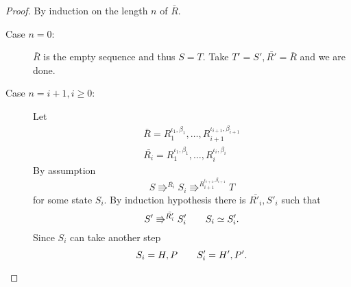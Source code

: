 \begin{proof}
  By induction on the length $n$ of $\bar{R}$.
  \begin{description}
    \item[Case $n = 0$:] $\bar{R}$ is the empty sequence and thus $S = T$. Take
      $T' = S', \bar{R'} = \bar{R}$ and we are done.
    \item[Case $n = i + 1, i \geq 0$:] Let
      \begin{equation*}
        \begin{gathered}
          \bar{R} = R_1^{\iota_1, \beta_1}, \dots, R_{i+1}^{\iota_{i+1},
          \beta_{i+1}} \\
          \bar{R_i} = R_1^{\iota_1, \beta_1}, \dots, R_{i}^{\iota_{i},
          \beta_{i}}
        \end{gathered}
      \end{equation*}
      By assumption
      \begin{equation*}
        S \Rrightarrow^{\bar{R_i}} S_i \Rrightarrow^{R_{i+1}^{\iota_{i+1},
        \beta_{i+1}}} T
      \end{equation*}
      for some state $S_i$. By induction hypothesis there is $\bar{R'_i}, S'_i$
      such that
      \begin{equation}
        S' \Rrightarrow^{\bar{R'_i}} S'_i \quad\quad S_i \simeq S'_i.
      \end{equation}
      Since $S_i$ can take another step
      \begin{equation*}
        S_i = H, P \quad\quad S'_i = H', P'.
      \end{equation*}
      

\end{description}
\end{proof}
